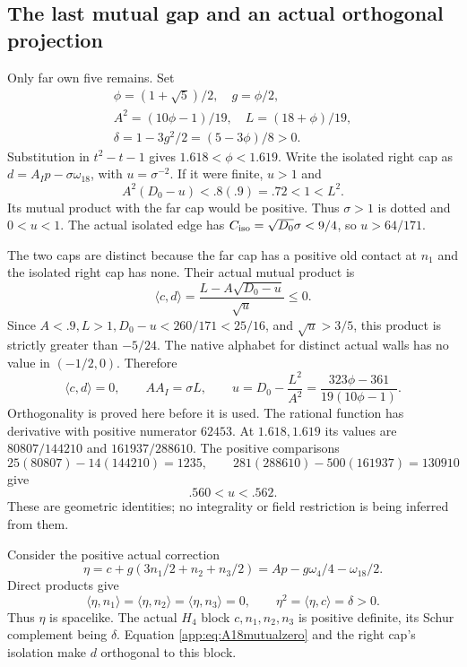 \documentclass[11pt]{article}
\theoremstyle{definition}
\theoremstyle{remark}
\newcommand{\ip}[2]{\langle #1,#2\rangle}
\begin{document}
\subsection{The last mutual gap and an actual orthogonal projection}
\label{app:A18jointpoint}
Only far own five remains. Set
\[
\begin{gathered}
 \phi=(1+\sqrt5)/2,\quad g=\phi/2,\\
 A^2=(10\phi-1)/19,\quad L=(18+\phi)/19,\\
 \delta=1-3g^2/2=(5-3\phi)/8>0.
\end{gathered}
\]
Substitution in \(t^2-t-1\) gives \(1.618<\phi<1.619\).
Write the isolated right cap as
\(d=A_Ip-\sigma\omega_{18}\), with \(u=\sigma^{-2}\).
If it were finite, \(u>1\) and
\[
 A^2(D_0-u)<.8(.9)=.72<1<L^2 .
\]
Its mutual product with the far cap would be positive.
Thus \(\sigma>1\) is dotted and \(0<u<1\).
The actual isolated edge has \(C_{\rm iso}=\sqrt{D_0}\sigma<9/4\),
so \(u>64/171\).

The two caps are distinct because the far cap has a positive old
contact at \(n_1\) and the isolated right cap has none.
Their actual mutual product is
\[
 \ip cd=\frac{L-A\sqrt{D_0-u}}{\sqrt u}\leq0.
\]
Since \(A<.9,L>1,D_0-u<260/171<25/16\), and
\(\sqrt u>3/5\), this product is strictly greater than \(-5/24\).
The native alphabet for distinct actual walls has no value in
\((-1/2,0)\). Therefore
\begin{equation}\label{app:eq:A18mutualzero}
 \ip cd=0,\qquad
 AA_I=\sigma L,\qquad
 u=D_0-\frac{L^2}{A^2}
   =\frac{323\phi-361}{19(10\phi-1)}.
\end{equation}
Orthogonality is proved here before it is used.
The rational function has derivative with positive numerator
\(62453\). At \(1.618,1.619\) its values are
\(80807/144210\) and \(161937/288610\).
The positive comparisons
\[
 25(80807)-14(144210)=1235,\qquad
 281(288610)-500(161937)=130910
\]
give
\begin{equation}\label{app:eq:A18uinterval}
 .560<u<.562 .
\end{equation}
These are geometric identities; no integrality or field restriction
is being inferred from them.

Consider the positive actual correction
\[
 \eta=c+g(3n_1/2+n_2+n_3/2)
      =A p-g\omega_4/4-\omega_{18}/2 .
\]
Direct products give
\[
 \ip\eta{n_1}=\ip\eta{n_2}=\ip\eta{n_3}=0,\qquad
 \eta^2=\ip\eta c=\delta>0.
\]
Thus \(\eta\) is spacelike. The actual \(H_4\) block
\(c,n_1,n_2,n_3\) is positive definite, its Schur complement being
\(\delta\). Equation \eqref{app:eq:A18mutualzero} and the right
cap's isolation make \(d\) orthogonal to this block.
\end{document}
